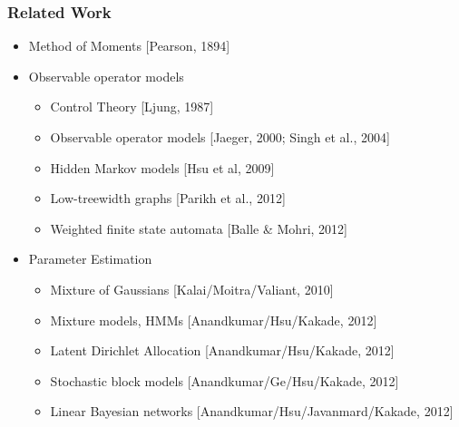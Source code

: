 \documentclass[xcolor={svgnames}]{beamer}
\begin{document}
\begin{frame}
  \frametitle{Related Work}
  \begin{itemize}
    \item<1-> Method of Moments [Pearson, 1894]
    \item<2-> Observable operator models
    \begin{itemize}
      \item Control Theory [Ljung, 1987]
      \item Observable operator models [Jaeger, 2000; Singh et al., 2004]
      \item \alert<2>{Hidden Markov models [Hsu et al, 2009]}
      \item Low-treewidth graphs [Parikh et al., 2012]
      \item Weighted finite state automata [Balle \& Mohri, 2012]
    \end{itemize}
     \item<3-> Parameter Estimation
  \begin{itemize}
    \item Mixture of Gaussians [Kalai/Moitra/Valiant, 2010]
    \item \alert{Mixture models, HMMs [Anandkumar/Hsu/Kakade, 2012]}
    \item Latent Dirichlet Allocation [Anandkumar/Hsu/Kakade, 2012]
    \item Stochastic block models [Anandkumar/Ge/Hsu/Kakade, 2012]
    \item Linear Bayesian networks [Anandkumar/Hsu/Javanmard/Kakade, 2012]
  \end{itemize}
  \end{itemize}
\end{frame}
\end{document}
